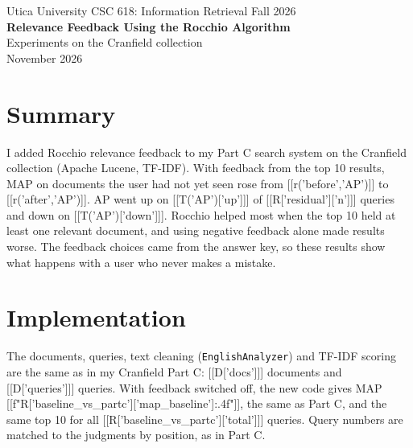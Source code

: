 
\begin{tcolorbox}[enhanced,colback=navy,colframe=navy,coltext=white,arc=6pt,boxrule=0pt,left=14pt,right=14pt,top=12pt,bottom=12pt]
{\small Utica University \textbar{} CSC 618: Information Retrieval \textbar{} Fall 2026}\\[6pt]
{\LARGE\bfseries Relevance Feedback Using the Rocchio Algorithm}\\[4pt]
{\large Experiments on the Cranfield collection}\\[8pt]
{\small November 2026}
\end{tcolorbox}

\section{Summary}
\begin{tcbraster}[raster columns=4,raster equal height,raster column skip=6pt]
\end{tcbraster}
\vspace{4pt}

I added Rocchio relevance feedback to my Part C search system on the Cranfield collection (Apache Lucene, TF-IDF). With feedback from the top 10 results, MAP on documents the user had not yet seen rose from [[r('before','AP')]] to [[r('after','AP')]]. AP went up on [[T('AP')['up']]] of [[R['residual']['n']]] queries and down on [[T('AP')['down']]]. Rocchio helped most when the top 10 held at least one relevant document, and using negative feedback alone made results worse. The feedback choices came from the answer key, so these results show what happens with a user who never makes a mistake.

\section{Implementation}
The documents, queries, text cleaning (\texttt{EnglishAnalyzer}) and TF-IDF scoring are the same as in my Cranfield Part C: [[D['docs']]] documents and [[D['queries']]] queries. With feedback switched off, the new code gives MAP [[f"{R['baseline_vs_partc']['map_baseline']:.4f}"]], the same as Part C, and the same top 10 for all [[R['baseline_vs_partc']['total']]] queries. Query numbers are matched to the judgments by position, as in Part C.

